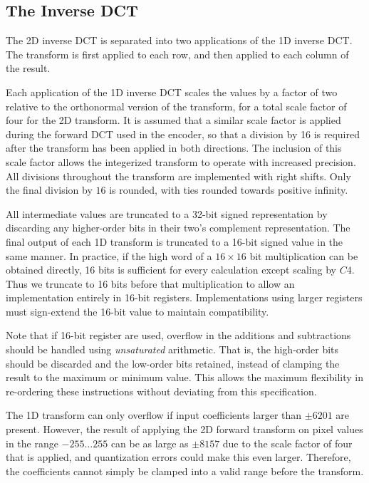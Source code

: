 \documentclass[9pt,letterpaper]{book}
\numberwithin{equation}{chapter}
\numberwithin{figure}{chapter}
\numberwithin{table}{chapter}
\begin{document}
\subsection{The Inverse DCT}

The 2D inverse DCT is separated into two applications of the 1D inverse DCT.
The transform is first applied to each row, and then applied to each column of
 the result.

Each application of the 1D inverse DCT scales the values by a factor of two
 relative to the orthonormal version of the transform, for a total scale factor
 of four for the 2D transform.
It is assumed that a similar scale factor is applied during the forward DCT
 used in the encoder, so that a division by 16 is required after the transform
 has been applied in both directions.
The inclusion of this scale factor allows the integerized transform to operate
 with increased precision.
All divisions throughout the transform are implemented with right shifts.
Only the final division by $16$ is rounded, with ties rounded towards positive
 infinity.

All intermediate values are truncated to a 32-bit signed representation by
 discarding any higher-order bits in their two's complement representation.
The final output of each 1D transform is truncated to a 16-bit signed value in
 the same manner.
In practice, if the high word of a $16\times 16$ bit multiplication can be
 obtained directly, 16 bits is sufficient for every calculation except scaling
 by $C4$.
Thus we truncate to 16 bits before that multiplication to allow an
 implementation entirely in 16-bit registers.
Implementations using larger registers must sign-extend the 16-bit value to
 maintain compatibility.

Note that if 16-bit register are used, overflow in the additions and
 subtractions should be handled using \textit{unsaturated} arithmetic.
That is, the high-order bits should be discarded and the low-order bits
 retained, instead of clamping the result to the maximum or minimum value.
This allows the maximum flexibility in re-ordering these instructions without
 deviating from this specification.

The 1D transform can only overflow if input coefficients larger than $\pm 6201$
 are present.
However, the result of applying the 2D forward transform on pixel values in the
 range $-255\ldots 255$ can be as large as $\pm 8157$ due to the scale factor
 of four that is applied, and quantization errors could make this even larger.
Therefore, the coefficients cannot simply be clamped into a valid range before
 the transform.
\end{document}
